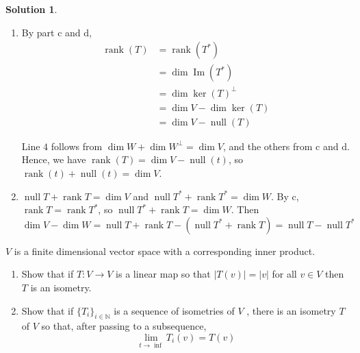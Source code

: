 \documentclass[11pt]{article}
\theoremstyle{definition}
\newenvironment{customex}[1]
  {\renewcommand\theinnercustomex{#1}\innercustomex}
  {\endinnercustomex}
\newtheorem*{solution}{Solution}
\newcommand{\N}{\mathbb{N}}
\DeclareMathOperator{\nul}{null}
\DeclareMathOperator{\rank}{rank}
\DeclareMathOperator{\im}{Im}
\DeclareMathOperator{\vdim}{dim}
\begin{document}
\begin{solution}
\begin{enumerate}[label = \alph*)]
            \item By part c and d,  
            \begin{align}
                \rank(T) &= \rank(T^*)\\
                &= \vdim \im(T^{*}) \\
                &= \vdim \ker(T)^{\perp} \\
                &= \dim V - \dim \ker(T)\\
                &= \dim V - \nul (T)
            \end{align}
    
            Line $4$ follows from $\dim W + \dim W^{\perp} = \dim V$, and the others from c and d. Hence, we have $\rank (T) = \dim V - \nul (t)$, so $\rank (t) + \nul (t) = \dim V$.
            \item $\nul T + \rank T = \dim V$ and $\nul T^* + \rank T^* = \dim W$. By c, $\rank T = \rank T^*$, so $\nul T^* + \rank T = \dim W$. Then $$\dim V - \dim W = \nul T + \rank T - (\nul T^* + \rank T) = \nul T - \nul T^*$$
        \end{enumerate}
    \end{solution}

    \begin{customex}{\textbf{3}}
        $V$ is a finite dimensional vector space with a corresponding inner product.
        \begin{enumerate}[label=\alph*)]
            \item Show that if $T : V \to V$ is a linear map so that $|T(v)| = |v|$ for all $v \in V$ then $T$ is an isometry.
            \item Show that if $\{T_i\}_{i\in \N}$ is a sequence of isometries of $V$ , there is an isometry $T$ of $V$ so that, after passing
            to a subsequence, $$\lim_{t \to \inf} T_i(v) = T(v)$$
        \end{enumerate}
    \end{customex}
\end{document}
